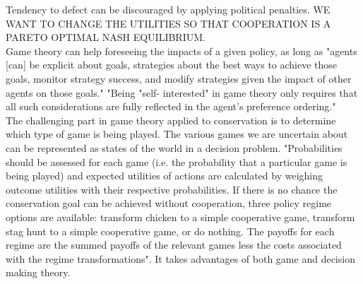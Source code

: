 \documentclass[12pt]{article}
\begin{document}
Tendency to defect can be discouraged by applying political penalties. WE WANT TO CHANGE THE UTILITIES SO THAT COOPERATION IS A PARETO OPTIMAL NASH EQUILIBRIUM.\\
Game theory can help foreseeing the impacts of a given policy, as long as "agents [can] be explicit
about goals, strategies about the best ways to achieve those goals, monitor strategy success, and modify strategies given the impact of other agents on those goals."
"Being "self-
interested" in game theory only requires that all such considerations are fully reflected in the agent’s preference ordering."\\
The challenging part in game theory applied to conservation is to determine which type of game is being played. The various games
we are uncertain about can be represented as states of the world in
a decision problem. "Probabilities
should be assessed for each game (i.e. the probability that a particular game is being played) and expected utilities of actions are calculated by weighing outcome utilities with their respective
probabilities. If there is no chance the conservation goal can be achieved without cooperation, three
policy regime options are available: transform chicken to a simple
cooperative game, transform stag hunt to a simple cooperative
game, or do nothing. The payoffs for each regime are the summed
payoffs of the relevant games less the costs associated with the regime transformations". It takes advantages of both game and decision making theory.\\
\end{document}
